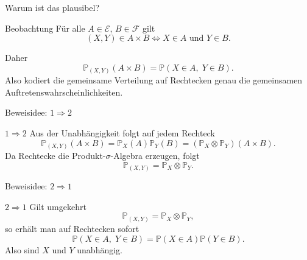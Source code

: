 \documentclass{beamer}
\begin{document}
\begin{frame}{Warum ist das plausibel?}
\begin{block}{Beobachtung}
Für alle \(A\in\mathcal E\), \(B\in\mathcal F\) gilt
\[
(X,Y)\in A\times B
\iff
X\in A \text{ und } Y\in B.
\]
\end{block}

\begin{block}{Daher}
\[
\mathbb P_{(X,Y)}(A\times B)
=
\mathbb P(X\in A,\;Y\in B).
\]
Also kodiert die gemeinsame Verteilung auf Rechtecken genau die gemeinsamen Auftretenswahrscheinlichkeiten.
\end{block}
\end{frame}

\begin{frame}{Beweisidee: \(1\Rightarrow 2\)}
\begin{block}{\(1\Rightarrow 2\)}
Aus der Unabhängigkeit folgt auf jedem Rechteck
\[
\mathbb P_{(X,Y)}(A\times B)
=
\mathbb P_X(A)\mathbb P_Y(B)
=
(\mathbb P_X\otimes\mathbb P_Y)(A\times B).
\]
Da Rechtecke die Produkt-\(\sigma\)-Algebra erzeugen, folgt
\[
\mathbb P_{(X,Y)}=\mathbb P_X\otimes\mathbb P_Y.
\]
\end{block}
\end{frame}

\begin{frame}{Beweisidee: \(2\Rightarrow 1\)}
\begin{block}{\(2\Rightarrow 1\)}
Gilt umgekehrt
\[
\mathbb P_{(X,Y)}=\mathbb P_X\otimes\mathbb P_Y,
\]
so erhält man auf Rechtecken sofort
\[
\mathbb P(X\in A,\;Y\in B)=\mathbb P(X\in A)\mathbb P(Y\in B).
\]
Also sind \(X\) und \(Y\) unabhängig.
\end{block}
\end{frame}
\end{document}
